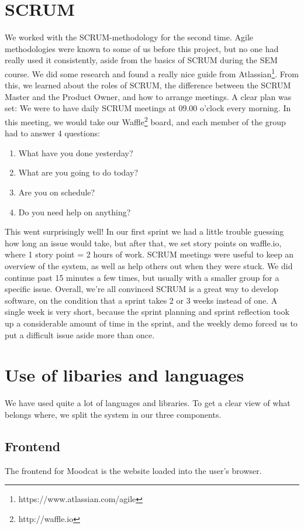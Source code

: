 \section{SCRUM}
We worked with the SCRUM-methodology for the second time.
Agile methodologies were known to some of us before this project, but no one had really used it consistently, aside from the basics of SCRUM during the SEM course.
We did some research and found a really nice guide from Atlassian\footnote{https://www.atlassian.com/agile}.
From this, we learned about the roles of SCRUM, the difference between the SCRUM Master and the Product Owner, and how to arrange meetings.
A clear plan was set: We were to have daily SCRUM meetings at 09.00 o'clock every morning.
In this meeting, we would take our Waffle\footnote{http://waffle.io} board, and each member of the group had to answer 4 questions:
\begin{enumerate}
\item What have you done yesterday?
\item What are you going to do today?
\item Are you on schedule?
\item Do you need help on anything?
\end{enumerate}
This went surprisingly well!
In our first sprint we had a little trouble guessing how long an issue would take, but after that, we set story points on waffle.io, where 1 story point = 2 hours of work.
SCRUM meetings were useful to keep an overview of the system, as well as help others out when they were stuck.
We did continue past 15 minutes a few times, but usually with a smaller group for a specific issue.
Overall, we're all convinced SCRUM is a great way to develop software, on the condition that a sprint takes 2 or 3 weeks instead of one.
A single week is very short, because the sprint planning and sprint reflection took up a considerable amount of time in the sprint, and the weekly demo forced us to put a difficult issue aside more than once.

\section{Use of libaries and languages}
We have used quite a lot of languages and libraries.
To get a clear view of what belongs where, we split the system in our three components.

\subsection{Frontend}
The frontend for Moodcat is the website loaded into the user's browser.

